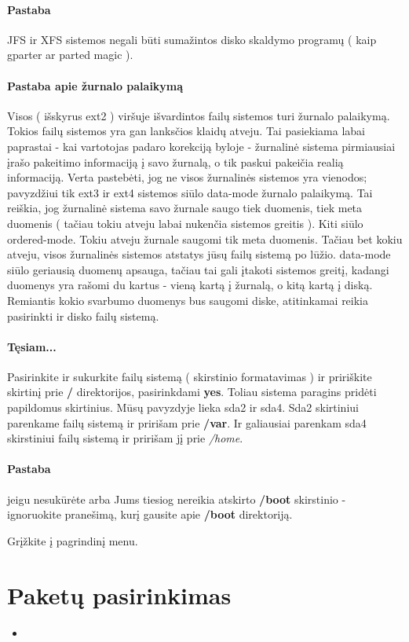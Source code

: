 \paragraph{Pastaba} JFS ir XFS sistemos negali būti sumažintos disko
skaldymo programų ( kaip gparter ar parted magic ).

\paragraph{Pastaba apie žurnalo palaikymą}

Visos ( išskyrus ext2 ) viršuje išvardintos failų sistemos turi
žurnalo palaikymą. Tokios failų sistemos yra gan
lanksčios klaidų atveju. Tai pasiekiama labai paprastai - kai
vartotojas padaro korekciją byloje - žurnalinė sistema pirmiausiai
įrašo pakeitimo informaciją į savo žurnalą, o tik paskui pakeičia
realią informaciją. Verta pastebėti, jog ne visos žurnalinės sistemos
yra vienodos; pavyzdžiui tik ext3 ir ext4 sistemos siūlo data-mode
žurnalo palaikymą. Tai reiškia, jog žurnalinė sistema savo žurnale
saugo tiek duomenis, tiek meta duomenis ( tačiau tokiu atveju labai
nukenčia sistemos greitis ). Kiti siūlo ordered-mode. Tokiu atveju
žurnale saugomi tik meta duomenis. Tačiau bet kokiu atveju, visos
žurnalinės sistemos atstatys jūsų failų sistemą po lūžio. data-mode
siūlo geriausią duomenų apsauga, tačiau tai gali įtakoti sistemos
greitį, kadangi duomenys yra rašomi du kartus - vieną kartą į žurnalą,
o kitą kartą į diską. Remiantis kokio svarbumo duomenys bus saugomi
diske, atitinkamai reikia pasirinkti ir disko failų sistemą.

\paragraph{Tęsiam...}

Pasirinkite ir sukurkite failų sistemą ( skirstinio formatavimas ) ir
pririškite skirtinį prie \textbf{/} direktorijos, pasirinkdami
\textbf{yes}. Toliau sistema paragins pridėti papildomus
skirtinius. Mūsų pavyzdyje lieka sda2 ir sda4. Sda2 skirtiniui
parenkame failų sistemą ir pririšam prie \textbf{/var}. Ir galiausiai
parenkam sda4 skirstiniui failų sistemą ir pririšam jį prie
\textsl{/home}.

\paragraph{Pastaba} jeigu nesukūrėte arba Jums tiesiog nereikia
atskirto \textbf{/boot} skirstinio - ignoruokite pranešimą, kurį
gausite apie \textbf{/boot} direktoriją.

Grįžkite į pagrindinį menu.

\section{Paketų pasirinkimas}

\begin{itemize}
  \item 
\end{itemize}
